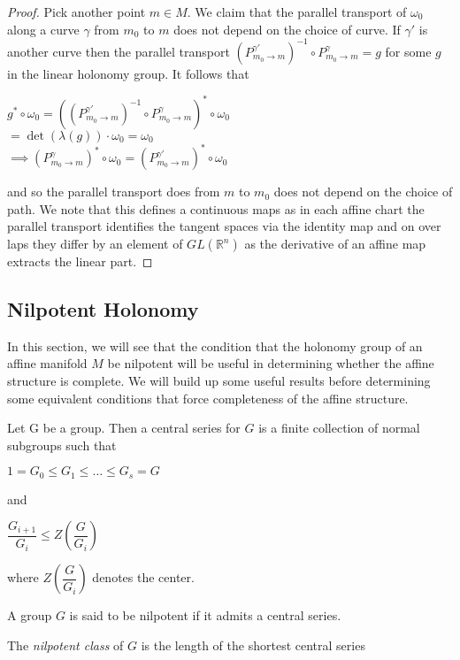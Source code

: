 \begin{proof}
    Pick another point $m \in M$. We claim that the parallel transport of
    $\omega_0$ along a curve $\gamma$ from $m_0$ to $m$ does not depend on the
    choice of curve. If $\gamma'$ is another curve then the parallel transport
    $(P^{\gamma'}_{m_0 \to m})^{-1} \circ P^{\gamma}_{m_0 \to m} = g$ for some $g$
    in the linear holonomy group. It follows that
    \begin{center}
        $g^* \circ \omega_0 = ((P^{\gamma'}_{m_0 \to m})^{-1} \circ P^{\gamma}_{m_0 \to m})^* \circ \omega_0$\\
        $ = \det(\lambda(g))\cdot \omega_0 = \omega_0$\\
        $\implies (P^{\gamma}_{m_0 \to m})^* \circ \omega_0 = (P^{\gamma'}_{m_0 \to m})^* \circ \omega_0$
    \end{center}
    and so the parallel transport does from $m$ to $m_0$ does not depend on the choice of path. We note
    that this defines a continuous maps as in each affine chart the parallel transport identifies the tangent
    spaces via the identity map and on over laps they differ by an element of $GL(\mathbb{R}^n)$ as the derivative
    of an affine map extracts the linear part.
\end{proof}

\subsection{Nilpotent Holonomy}
In this section, we will see that the condition that the holonomy group of an
affine manifold $M$ be nilpotent will be useful in determining whether the
affine structure is complete. We will build up some useful results before
determining some equivalent conditions that force completeness of the affine
structure.

\begin{definition}
    Let G be a group. Then a central series for $G$ is a finite collection of normal subgroups
    such that
    \begin{center}
        $1=G_0 \leq G_1 \leq \dots \leq G_s = G$
    \end{center}
    and
    \begin{center}
        $\dfrac{G_{i+1}}{G_i} \leq Z(\dfrac{G}{G_i})$
    \end{center}
    where $Z(\dfrac{G}{G_i})$ denotes the center.
\end{definition}

\begin{definition}
    A group $G$ is said to be nilpotent if it admits a central series.
\end{definition}
\begin{remark}
    The \textit{nilpotent class} of $G$ is the length of the shortest central series
\end{remark}

